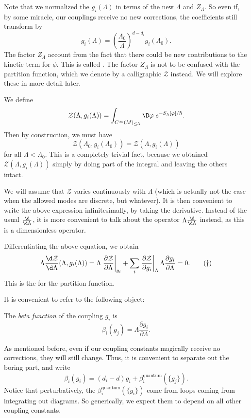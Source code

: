 \documentclass[a4paper]{article}
\begin{document}
Note that we normalized the $g_i(\Lambda)$ in terms of the new $\Lambda$ and $Z_\Lambda$. So even if, by some miracle, our couplings receive no new corrections, the coefficients still transform by
\[
  g_i(\Lambda) = \left(\frac{\Lambda_0}{\Lambda}\right)^{d - d_i} g_i(\Lambda_0).
\]
The factor $Z_\Lambda$ account from the fact that there could be new contributions to the kinetic term for $\phi$. This  is called . The factor $Z_\Lambda$ is not to be confused with the partition function, which we denote by a calligraphic $\mathcal{Z}$ instead. We will explore these in more detail later.

We define
\[
  \mathcal{Z}(\Lambda, g_i(\Lambda)) = \int_{C^\infty(M)_{\leq \Lambda}} \D \varphi\; e^{-S_{\Lambda}[\varphi]/\hbar}.
\]
Then by construction, we must have
\[
  \mathcal{Z}(\Lambda_0, g_i(\Lambda_0)) = \mathcal{Z}(\Lambda, g_i(\Lambda))
\]
for all $\Lambda < \Lambda_0$. This is a completely trivial fact, because we obtained $\mathcal{Z}(\Lambda, g_i(\Lambda))$ simply by doing part of the integral and leaving the others intact.

We will assume that $\mathcal{Z}$ varies continuously with $\Lambda$ (which is actually not the case when the allowed modes are discrete, but whatever). It is then convenient to write the above expression infinitesimally, by taking the derivative. Instead of the usual $\frac{\d}{\d \Lambda}$, it is more convenient to talk about the operator $\Lambda \frac{\d}{\d \Lambda}$ instead, as this is a dimensionless operator.

Differentiating the above equation, we obtain
\[
  \Lambda \frac{\d \mathcal{Z}}{\d \Lambda} (\Lambda, g_i(\Lambda)) = \Lambda \left.\frac{\partial \mathcal{Z}}{\partial \Lambda}\right|_{g_i} + \sum_i \left.\frac{\partial \mathcal{Z}}{\partial g_i}\right|_{\Lambda} \Lambda \frac{\partial g_i}{\partial \Lambda} = 0. \tag{$\dagger$}
\]
This is the  for the partition function.

It is convenient to refer to the following object:
\begin{defi}
  The \emph{beta function} of the coupling $g_i$ is
  \[
    \beta_i (g_j) = \Lambda \frac{\partial g_i}{\partial \Lambda}.
  \]
\end{defi}

As mentioned before, even if our coupling constants magically receive no corrections, they will still change. Thus, it is convenient to separate out the boring part, and write
\[
  \beta_i(g_i) = (d_i - d) g_i + \beta_i^{\mathrm{quantum}} (\{g_j\}).
\]
Notice that perturbatively, the $\beta_i^{\mathrm{quantum}} (\{g_i\})$ come from loops coming from integrating out diagrams. So generically, we expect them to depend on all other coupling constants.
\end{document}
